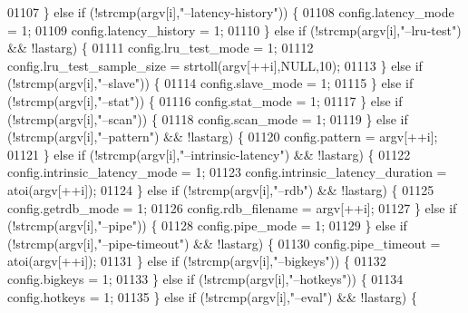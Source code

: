 \begin{DoxyCode}
{{{{{{{{{{{{{{{{{{{{{{{{{{{{{01107         \} \textcolor{keywordflow}{else} \textcolor{keywordflow}{if} (!strcmp(argv[i],\textcolor{stringliteral}{"--latency-history"})) \{
01108             config.latency\_mode = 1;
01109             config.latency\_history = 1;
01110         \} \textcolor{keywordflow}{else} \textcolor{keywordflow}{if} (!strcmp(argv[i],\textcolor{stringliteral}{"--lru-test"}) && !lastarg) \{
01111             config.lru\_test\_mode = 1;
01112             config.lru\_test\_sample\_size = strtoll(argv[++i],NULL,10);
01113         \} \textcolor{keywordflow}{else} \textcolor{keywordflow}{if} (!strcmp(argv[i],\textcolor{stringliteral}{"--slave"})) \{
01114             config.slave\_mode = 1;
01115         \} \textcolor{keywordflow}{else} \textcolor{keywordflow}{if} (!strcmp(argv[i],\textcolor{stringliteral}{"--stat"})) \{
01116             config.stat\_mode = 1;
01117         \} \textcolor{keywordflow}{else} \textcolor{keywordflow}{if} (!strcmp(argv[i],\textcolor{stringliteral}{"--scan"})) \{
01118             config.scan\_mode = 1;
01119         \} \textcolor{keywordflow}{else} \textcolor{keywordflow}{if} (!strcmp(argv[i],\textcolor{stringliteral}{"--pattern"}) && !lastarg) \{
01120             config.pattern = argv[++i];
01121         \} \textcolor{keywordflow}{else} \textcolor{keywordflow}{if} (!strcmp(argv[i],\textcolor{stringliteral}{"--intrinsic-latency"}) && !lastarg) \{
01122             config.intrinsic\_latency\_mode = 1;
01123             config.intrinsic\_latency\_duration = atoi(argv[++i]);
01124         \} \textcolor{keywordflow}{else} \textcolor{keywordflow}{if} (!strcmp(argv[i],\textcolor{stringliteral}{"--rdb"}) && !lastarg) \{
01125             config.getrdb\_mode = 1;
01126             config.rdb\_filename = argv[++i];
01127         \} \textcolor{keywordflow}{else} \textcolor{keywordflow}{if} (!strcmp(argv[i],\textcolor{stringliteral}{"--pipe"})) \{
01128             config.pipe\_mode = 1;
01129         \} \textcolor{keywordflow}{else} \textcolor{keywordflow}{if} (!strcmp(argv[i],\textcolor{stringliteral}{"--pipe-timeout"}) && !lastarg) \{
01130             config.pipe\_timeout = atoi(argv[++i]);
01131         \} \textcolor{keywordflow}{else} \textcolor{keywordflow}{if} (!strcmp(argv[i],\textcolor{stringliteral}{"--bigkeys"})) \{
01132             config.bigkeys = 1;
01133         \} \textcolor{keywordflow}{else} \textcolor{keywordflow}{if} (!strcmp(argv[i],\textcolor{stringliteral}{"--hotkeys"})) \{
01134             config.hotkeys = 1;
01135         \} \textcolor{keywordflow}{else} \textcolor{keywordflow}{if} (!strcmp(argv[i],\textcolor{stringliteral}{"--eval"}) && !lastarg) \{
}}}}}}}}}}}}}}}}}}}}}}}}}}}}}
\end{DoxyCode}

